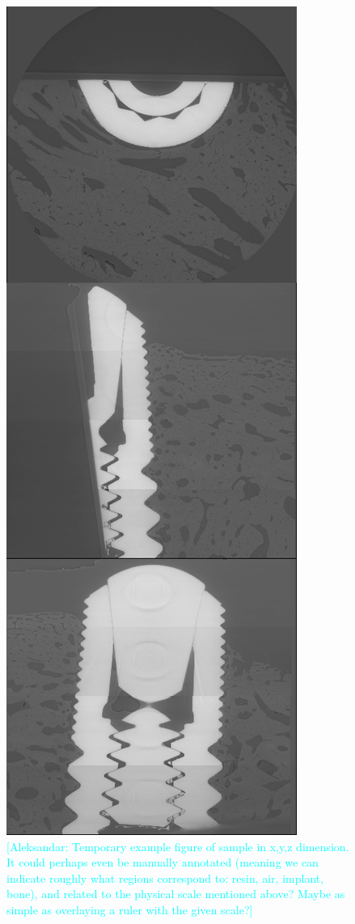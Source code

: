 \documentclass[times,twocolumn,final]{elsarticle}
\newcommand{\aleksandar}[1]{\textcolor{cyan}{[Aleksandar: #1]}}
\begin{document}
\begin{figure}%
\centering
\includegraphics[scale=0.50]{figures/3_view_sample.png}
\caption{\aleksandar{Temporary example figure of sample in x,y,z dimension. It could perhaps even be manually annotated (meaning we can indicate roughly what regions correspond to: resin, air, implant, bone), and related to the physical scale mentioned above? Maybe as simple as overlaying a ruler with the given scale?}}
\label{fig:3viewsample}
\end{figure}
\end{document}
